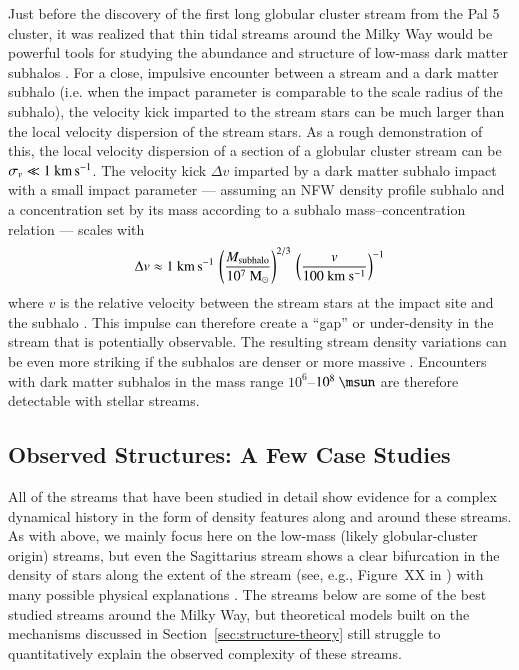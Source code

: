\documentclass[final,5p,times,twocolumn,authoryear]{elsarticle}
\begin{document}
Just before the discovery of the first long globular cluster stream from the Pal 5
cluster, it was realized that thin tidal streams around the Milky Way would be powerful
tools for studying the abundance and structure of low-mass dark matter subhalos
\citep{ibata:2002,johnston:2002}.
For a close, impulsive encounter between a stream and a dark matter subhalo (i.e. when
the impact parameter is comparable to the scale radius of the subhalo), the velocity
kick imparted to the stream stars can be much larger than the local velocity dispersion
of the stream stars.
As a rough demonstration of this, the local velocity dispersion of a section of a
globular cluster stream can be $\sigma_v \ll 1~\kms$.
The velocity kick $\Delta v$ imparted by a dark matter subhalo impact with a small
impact parameter --- assuming an NFW density profile subhalo and a concentration set by
its mass according to a subhalo mass--concentration relation \citep{moline:2017} ---
scales with
\begin{equation}
    \Delta v \approx 1~\kms \,
        \left(\frac{M_{\rm subhalo}}{10^7~{\rm M}_\odot}\right)^{2/3}\,
        \left(\frac{v}{100~{\rm km}~{\rm s}^{-1}}\right)^{-1}
\end{equation}
where $v$ is the relative velocity between the stream stars at the impact site and the
subhalo \citep[see also][]{erkal:2015a, sanders:2016}.
This impulse can therefore create a ``gap'' or under-density in the stream that is
potentially observable.
The resulting stream density variations can be even more striking if the subhalos are
denser or more massive \citep[see, e.g.,][]{yoon:2011, bonaca:2014}.
Encounters with dark matter subhalos in the mass range $10^6$--$10^8~\unit{\msun}$ are
therefore detectable with stellar streams.


\subsection{Observed Structures: A Few Case Studies}
\label{sec:structure-obs}

All of the streams that have been studied in detail show evidence for a complex
dynamical history in the form of density features along and around these streams.
As with above, we mainly focus here on the low-mass (likely globular-cluster origin)
streams, but even the Sagittarius stream shows a clear bifurcation in the density of
stars along the extent of the stream (see, e.g., Figure~XX in \citealt{todo}) with many
possible physical explanations \citep[e.g.,][]{todo}.
The streams below are some of the best studied streams around the Milky Way, but
theoretical models built on the mechanisms discussed in
Section~\ref{sec:structure-theory} still struggle to quantitatively explain the observed
complexity of these streams.
\end{document}
